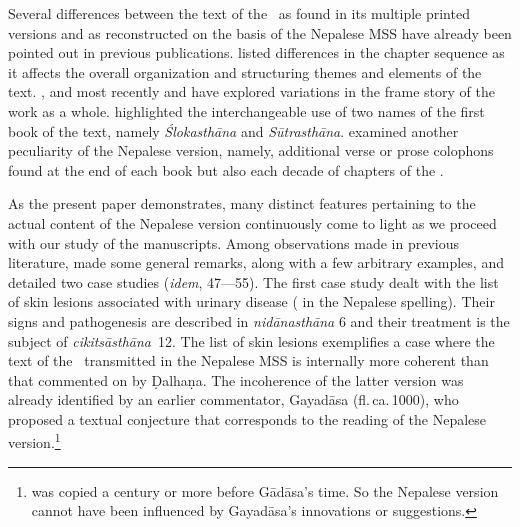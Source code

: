 
Several differences between the text of the \SS\ as found in its multiple printed versions and 
as reconstructed on the basis of the Nepalese MSS have already been pointed out in previous 
publications.  \citet[27f.]{kleb-2021b} listed differences in the chapter sequence as it affects 
the overall organization and structuring themes and elements of the text.  
\citet{wuja-2013}, \citet[28-32]{kleb-2021b} and most recently \citet{birc-2021} and 
\citet[2-4]{birc-2021a} have explored variations in the frame story of the work as a whole.
\citet[32-36]{kleb-2021b} highlighted the interchangeable use of two names
of the first book of the text, namely \emph{Ślokasthāna} and \emph{Sūtrasthāna}. 
\citet[37-44]{kleb-2021b} examined another peculiarity of the Nepalese version, namely, 
additional verse or prose colophons found at the end of each book but also each decade of 
chapters of the \SS.

As the present paper demonstrates, many distinct features pertaining to the actual
content of the Nepalese version continuously come to light as we proceed with our
study of the manuscripts. Among observations made in previous literature,
\citet[44--47]{kleb-2021b} made some general remarks, along with a few arbitrary
examples, and detailed two case studies (\textit{idem}, 47---55). The first case
study dealt with the list of skin lesions associated with urinary disease
( in the Nepalese spelling).  Their signs and pathogenesis are
described in \emph{nidānasthāna} 6 and their treatment is the subject of
\emph{cikitsāsthāna}~12. %
The list of skin lesions exemplifies a case where the text of the \SS\ transmitted
in the Nepalese MSS is internally more coherent than that commented on by Ḍalhaṇa.
The incoherence of the latter version was already identified by an earlier
commentator, Gayadāsa (fl.\,ca.\,1000), who %
proposed a textual conjecture that corresponds to the reading of the Nepalese
version.\footnote{ was copied a century or more before
Gādāsa's time.  So the Nepalese version cannot have been influenced by Gayadāsa's
innovations or suggestions.}

